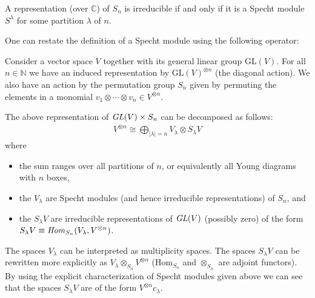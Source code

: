     \begin{property}
        A representation (over $\mathbb{C}$) of $S_n$ is irreducible if and only if it is a Specht module $S^\lambda$ for some partition $\lambda$ of $n$.
    \end{property}

    One can restate the definition of a Specht module using the following operator:

    Consider a vector space $V$ together with its general linear group $\text{GL}(V)$. For all $n\in\mathbb{N}$ we have an induced representation by $\text{GL}(V)^{\otimes n}$ (the diagonal action). We also have an action by the permutation group $S_n$ given by permuting the elements in a monomial $v_1\otimes\cdots\otimes v_n\in V^{\otimes n}$.
    \begin{theorem}
        The above representation of $\text{\emph{GL}}(V)\times S_n$ can be decomposed as follows:
        \begin{gather}
            V^{\otimes n} \cong \bigoplus_{|\lambda|=n} V_\lambda\otimes S_\lambda V
        \end{gather}
        where
        \begin{itemize}
            \item the sum ranges over all partitions of $n$, or equivalently all Young diagrams with $n$ boxes,
            \item the $V_\lambda$ are Specht modules (and hence irreducible representations) of $S_n$, and
            \item the $S_\lambda V$ are irreducible representations of $\text{\emph{GL}}(V)$ (possibly zero) of the form $S_\lambda V \equiv\text{\emph{Hom}}_{S_n}(V_\lambda, V^{\otimes n})$.
        \end{itemize}
    \end{theorem}
    The spaces $V_\lambda$ can be interpreted as multiplicity spaces. The spaces $S_\lambda V$ can be rewritten more explicitly as $V_\lambda\otimes_{S_n} V^{\otimes n}$ ($\text{Hom}_{S_n}$ and $\otimes_{S_n}$ are adjoint functors). By using the explicit characterization of Specht modules given above we can see that the spaces $S_\lambda V$ are of the form $V^{\otimes n}c_\lambda$.

